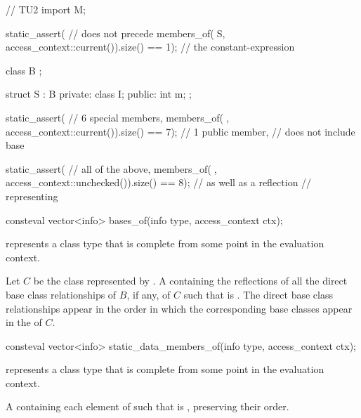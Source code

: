 \begin{itemdescr}
\begin{example}
\begin{codeblock}
// TU2
import M;

static_assert(                                                  //  does not precede
  members_of(^^NS, access_context::current()).size() == 1);     // the constant-expression

class B {};

struct S : B {
private:
  class I;
public:
  int m;
};

static_assert(                                                  // 6 special members,
  members_of(^^S, access_context::current()).size() == 7);      // 1 public member,
                                                                // does not include base

static_assert(                                                  // all of the above,
  members_of(^^S, access_context::unchecked()).size() == 8);    // as well as a reflection
                                                                // representing 
\end{codeblock}
\end{example}
\end{itemdescr}

%
\begin{itemdecl}
consteval vector<info> bases_of(info type, access_context ctx);
\end{itemdecl}

\begin{itemdescr}
\pnum
\constantwhen
{} represents a class type
that is complete from some point in the evaluation context.

\pnum
\returns
Let $C$ be the class represented by .
A  containing the reflections
of all the direct base class relationships of $B$, if any,
of $C$ such that  is .
The direct base class relationships appear in the order in which
the corresponding base classes appear in the  of $C$.
\end{itemdescr}

%
\begin{itemdecl}
consteval vector<info> static_data_members_of(info type, access_context ctx);
\end{itemdecl}

\begin{itemdescr}
\pnum
\constantwhen
{} represents a class type
that is complete from some point in the evaluation context.

\pnum
\returns
A  containing each element  of 
such that  is ,
preserving their order.
\end{itemdescr}


